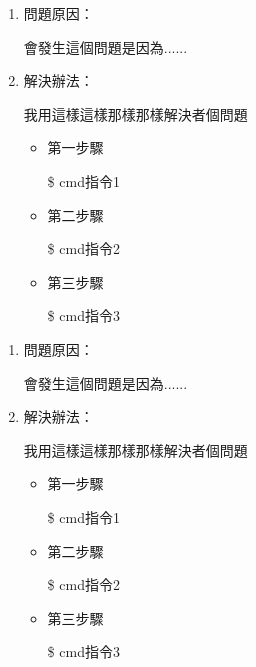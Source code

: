 


\begin{enumerate}
\item 問題原因：

會發生這個問題是因為......


\item 解決辦法：

我用這樣這樣那樣那樣解決者個問題
	\begin{itemize}
	\item 第一步驟
	
	\colorbox{mygray}{\$ cmd指令1}
	
	\item 第二步驟
	
	\colorbox{mygray}{\$ cmd指令2}
	
	\item 第三步驟
		
	\colorbox{mygray}{\$ cmd指令3}
	
	\end{itemize}
\end{enumerate}



\begin{enumerate}
	\item 問題原因：
	
	會發生這個問題是因為......
	
	
	\item 解決辦法：
	
	我用這樣這樣那樣那樣解決者個問題
	\begin{itemize}
		\item 第一步驟
		
		\colorbox{mygray}{\$ cmd指令1}
		
		\item 第二步驟
		
		\colorbox{mygray}{\$ cmd指令2}
		
		\item 第三步驟
		
		\colorbox{mygray}{\$ cmd指令3}
		
	\end{itemize}
\end{enumerate}






